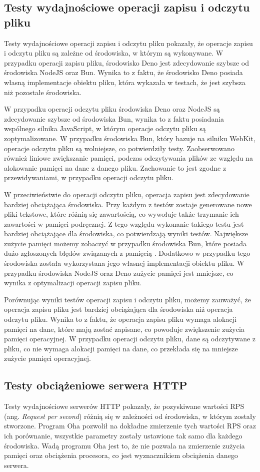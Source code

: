 \subsection{Testy wydajnościowe operacji zapisu i odczytu pliku}
Testy wydajnościowe operacji zapisu i odczytu pliku pokazały, że operacje zapisu i odczytu pliku są zależne od środowiska, w którym są wykonywane. W przypadku operacji zapisu pliku, środowisko Deno jest zdecydowanie szybsze od środowiska NodeJS oraz Bun. Wynika to z faktu, że środowisko Deno posiada własną implementacje obiektu pliku, która wykazała w testach, że jest szybsza niż pozostałe środowiska.

W przypadku operacji odczytu pliku środowiska Deno oraz NodeJS są zdecydowanie szybsze od środowiska Bun, wynika to z faktu posiadania wspólnego silnika JavaScript, w którym operacje odczytu pliku są zoptymalizowane. W przypadku środowiska Bun, który bazuje na silniku WebKit, operacje odczytu pliku są wolniejsze, co potwierdziły testy. Zaobserwowano również liniowe zwiększanie pamięci, podczas odczytywania plików ze względu na alokowanie pamięci na dane z danego pliku. Zachowanie to jest zgodne z przewidywaniami, w przypadku operacji odczytu pliku.

W przeciwieństwie do operacji odczytu pliku, operacja zapisu jest zdecydowanie bardziej obciążająca środowiska. Przy każdym z testów zostaje generowane nowe pliki tekstowe, które różnią się zawartością, co wywołuje także trzymanie ich zawartości w pamięci podręcznej. Z tego względu wykonanie takiego testu jest bardziej obciążające dla środowiska, co potwierdzają wyniki testów. Największe zużycie pamięci możemy zobaczyć w przypadku środowiska Bun, które posiada dużo zgłoszonych błędów związanych z pamięcią \cite{bun_memory}. Dodatkowo w przypadku tego środowiska została wykorzystana jego własnej implementacji obiektu pliku. W przypadku środowiska NodeJS oraz Deno zużycie pamięci jest mniejsze, co wynika z optymalizacji operacji zapisu pliku.

Porównując wyniki testów operacji zapisu i odczytu pliku, możemy zauważyć, że operacja zapisu pliku jest bardziej obciążająca dla środowiska niż operacja odczytu pliku. Wynika to z faktu, że operacja zapisu pliku wymaga alokacji pamięci na dane, które mają zostać zapisane, co powoduje zwiększenie zużycia pamięci operacyjnej. W przypadku operacji odczytu pliku, dane są odczytywane z pliku, co nie wymaga alokacji pamięci na dane, co przekłada się na mniejsze zużycie pamięci operacyjnej.

\subsection{Testy obciążeniowe serwera HTTP}
Testy wydajnościowe serwerów HTTP pokazały, że pozyskiwane wartości RPS (ang. \textit{Request per second}) różnią się w zależności od środowiska, w którym zostały stworzone. Program Oha \cite{oha} pozwolił na dokładne zmierzenie tych wartości RPS oraz ich porównanie, wszystkie parametry zostały ustawione tak samo dla każdego środowiska. Wadą programu Oha jest to, że nie pozwala na zmierzenie zużycia pamięci oraz obciążenia procesora, co jest wyznacznikiem obciążenia danego serwera.

